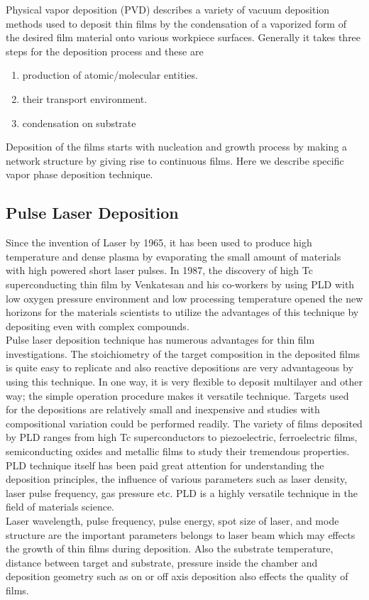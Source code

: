 Physical vapor deposition (PVD) describes a variety of vacuum deposition methods used to deposit thin films by the condensation of a vaporized form of the desired film material onto various workpiece surfaces. Generally it takes three steps for the deposition process and these are 
\begin{enumerate}
  \item production of atomic/molecular entities.
  \item their transport environment.
  \item condensation on substrate
\end{enumerate} 
Deposition of the films starts with nucleation and growth process by making a network structure by giving rise to continuous films.
Here we describe specific vapor phase deposition technique.

\subsection{Pulse Laser Deposition}
Since the invention of Laser by 1965, it has been used to produce high temperature and dense plasma by evaporating the small amount of materials with high powered short laser pulses. In 1987, the discovery of high Tc superconducting thin film by Venkatesan and his co-workers by using PLD with low oxygen pressure environment and low processing temperature opened the new horizons for the materials scientists to utilize the advantages of this technique by depositing even with complex compounds.\\
Pulse laser deposition technique has numerous advantages for thin film investigations. The stoichiometry of the target composition in the deposited films is quite easy to replicate and also reactive depositions are very advantageous by using this technique. In one way, it is very flexible to deposit multilayer and other way; the simple operation procedure makes it versatile technique. Targets used for the depositions are relatively small and inexpensive and studies with compositional variation could be performed readily. The variety of films deposited by PLD ranges from high Tc superconductors to piezoelectric, ferroelectric films, semiconducting oxides and metallic films to study their tremendous properties. PLD technique itself has been paid great attention for understanding the deposition principles, the influence of various parameters such as laser density, laser pulse frequency, gas pressure etc. PLD is a highly versatile technique in the field of materials science.\\
Laser wavelength, pulse frequency, pulse energy, spot size of laser, and mode structure are the important parameters belongs to laser beam which may effects the growth of thin films during deposition. Also the substrate temperature, distance between target and substrate, pressure inside the chamber and deposition geometry such as on or off axis deposition also effects the quality of films.

